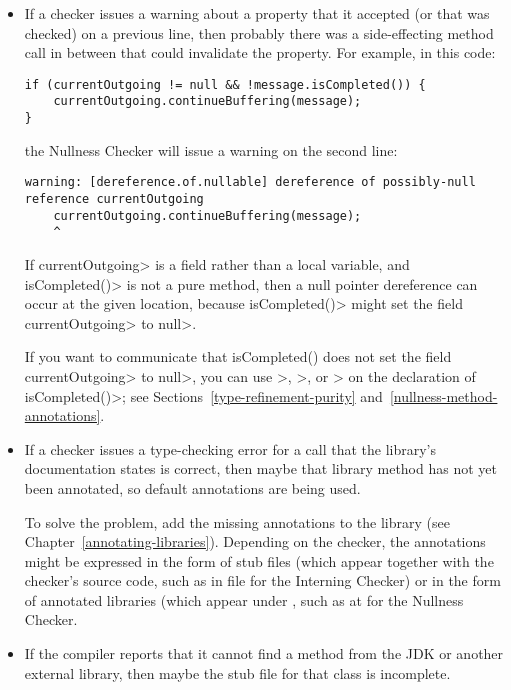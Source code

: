 \begin{itemize}
\item
If a checker issues a warning about a property that it accepted (or that
was checked) on a previous line, then probably there was a side-effecting
method call in between that could invalidate the property.  For example, in
this code:

\begin{Verbatim}
if (currentOutgoing != null && !message.isCompleted()) {
    currentOutgoing.continueBuffering(message);
}
\end{Verbatim}

\noindent
the Nullness Checker will issue a warning on the second line:
\begin{Verbatim}
warning: [dereference.of.nullable] dereference of possibly-null reference currentOutgoing
    currentOutgoing.continueBuffering(message);
    ^
\end{Verbatim}

If \<currentOutgoing> is a field rather than a local variable, and
\<isCompleted()> is not a pure method, then a null pointer
dereference can occur at the given location, because \<isCompleted()> might set
the field \<currentOutgoing> to \<null>.

If you want to communicate that
isCompleted() does not set the field \<currentOutgoing> to \<null>, you can use
\<>,
\<>,
or \<> on the
declaration of \<isCompleted()>; see Sections~\ref{type-refinement-purity}
and~\ref{nullness-method-annotations}.


\item
If a checker issues a type-checking error for a call that the library's
documentation states is correct, then maybe that library method has not yet
been annotated, so default annotations are being used.

To solve the problem, add the missing annotations to the library (see
Chapter~\ref{annotating-libraries}).  Depending on the checker, the
annotations might be expressed in the form of stub files (which appear
together with the checker's source code, such as in file
 for the
Interning Checker) or in the form of annotated libraries (which appear
under , such as at  for
the Nullness Checker.

\item
If the compiler reports that it cannot find a method from the JDK or
another external library, then maybe the stub file for that class
is incomplete.


\end{itemize}
